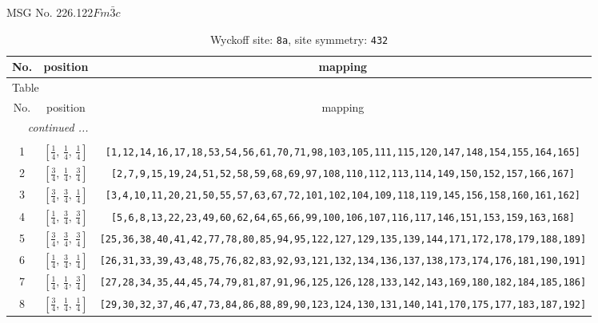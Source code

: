 \documentclass[fleqn,8pt]{jsarticle}
\begin{document}
\setcounter{MaxMatrixCols}{32}

\renewcommand{\tablename}{Table~}
\renewcommand{\figurename}{Figure~}
\begin{center}
\LARGE
MSG No. 226.122\quad$Fm\bar{3}c$
\end{center}
\renewcommand{\arraystretch}{1.2}
\begin{longtable}{ccc}
\caption{Wyckoff site: {\tt 8a}, site symmetry: {\tt 432}}
 \\
 \hline \hline
No. & position & mapping \\ \hline \endfirsthead

\multicolumn{2}{l}{\tablename\ \thetable{}} \\
 \hline \hline
No. & position & mapping \\ \hline \endhead

 \hline \hline
\multicolumn{2}{r}{\footnotesize\it continued ...} \\ \endfoot

 \hline \hline
\multicolumn{2}{r}{} \\ \endlastfoot

1 & $\left[ \frac{1}{4},\, \frac{1}{4},\, \frac{1}{4} \right]$ & {\tt [1,12,14,16,17,18,53,54,56,61,70,71,98,103,105,111,115,120,147,148,154,155,164,165]} \\ \hline
2 & $\left[ \frac{3}{4},\, \frac{1}{4},\, \frac{3}{4} \right]$ & {\tt [2,7,9,15,19,24,51,52,58,59,68,69,97,108,110,112,113,114,149,150,152,157,166,167]} \\ \hline
3 & $\left[ \frac{3}{4},\, \frac{3}{4},\, \frac{1}{4} \right]$ & {\tt [3,4,10,11,20,21,50,55,57,63,67,72,101,102,104,109,118,119,145,156,158,160,161,162]} \\ \hline
4 & $\left[ \frac{1}{4},\, \frac{3}{4},\, \frac{3}{4} \right]$ & {\tt [5,6,8,13,22,23,49,60,62,64,65,66,99,100,106,107,116,117,146,151,153,159,163,168]} \\ \hline
5 & $\left[ \frac{3}{4},\, \frac{3}{4},\, \frac{3}{4} \right]$ & {\tt [25,36,38,40,41,42,77,78,80,85,94,95,122,127,129,135,139,144,171,172,178,179,188,189]} \\ \hline
6 & $\left[ \frac{1}{4},\, \frac{3}{4},\, \frac{1}{4} \right]$ & {\tt [26,31,33,39,43,48,75,76,82,83,92,93,121,132,134,136,137,138,173,174,176,181,190,191]} \\ \hline
7 & $\left[ \frac{1}{4},\, \frac{1}{4},\, \frac{3}{4} \right]$ & {\tt [27,28,34,35,44,45,74,79,81,87,91,96,125,126,128,133,142,143,169,180,182,184,185,186]} \\ \hline
8 & $\left[ \frac{3}{4},\, \frac{1}{4},\, \frac{1}{4} \right]$ & {\tt [29,30,32,37,46,47,73,84,86,88,89,90,123,124,130,131,140,141,170,175,177,183,187,192]} \\
\end{longtable}
\end{document}
